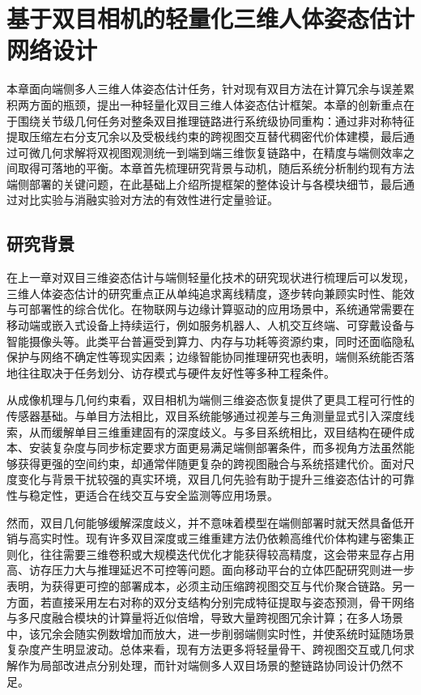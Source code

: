 \clearpage
\section{基于双目相机的轻量化三维人体姿态估计网络设计}

本章面向端侧多人三维人体姿态估计任务，针对现有双目方法在计算冗余与误差累积两方面的瓶颈，提出一种轻量化双目三维人体姿态估计框架。本章的创新重点在于围绕关节级几何任务对整条双目推理链路进行系统级协同重构：通过非对称特征提取压缩左右分支冗余以及受极线约束的跨视图交互替代稠密代价体建模，最后通过可微几何求解将双视图观测统一到端到端三维恢复链路中，在精度与端侧效率之间取得可落地的平衡。本章首先梳理研究背景与动机，随后系统分析制约现有方法端侧部署的关键问题，在此基础上介绍所提框架的整体设计与各模块细节，最后通过对比实验与消融实验对方法的有效性进行定量验证。

\subsection{研究背景}
在上一章对双目三维姿态估计与端侧轻量化技术的研究现状进行梳理后可以发现，三维人体姿态估计的研究重点正从单纯追求离线精度，逐步转向兼顾实时性、能效与可部署性的综合优化。在物联网与边缘计算驱动的应用场景中，系统通常需要在移动端或嵌入式设备上持续运行，例如服务机器人、人机交互终端、可穿戴设备与智能摄像头等。此类平台普遍受到算力、内存与功耗等资源约束，同时还面临隐私保护与网络不确定性等现实因素；边缘智能协同推理研究也表明，端侧系统能否落地往往取决于任务划分、访存模式与硬件友好性等多种工程条件。

从成像机理与几何约束看，双目相机为端侧三维姿态恢复提供了更具工程可行性的传感器基础。与单目方法相比，双目系统能够通过视差与三角测量显式引入深度线索，从而缓解单目三维重建固有的深度歧义。与多目系统相比，双目结构在硬件成本、安装复杂度与同步标定要求方面更易满足端侧部署条件，而多视角方法虽然能够获得更强的空间约束，却通常伴随更复杂的跨视图融合与系统搭建代价。面对尺度变化与背景干扰较强的真实环境，双目几何先验有助于提升三维姿态估计的可靠性与稳定性，更适合在线交互与安全监测等应用场景。

然而，双目几何能够缓解深度歧义，并不意味着模型在端侧部署时就天然具备低开销与高实时性。现有许多双目深度或三维重建方法仍依赖高维代价体构建与密集正则化，往往需要三维卷积或大规模迭代优化才能获得较高精度，这会带来显存占用高、访存压力大与推理延迟不可控等问题。面向移动平台的立体匹配研究则进一步表明，为获得更可控的部署成本，必须主动压缩跨视图交互与代价聚合链路。另一方面，若直接采用左右对称的双分支结构分别完成特征提取与姿态预测，骨干网络与多尺度融合模块的计算量将近似倍增，导致大量跨视图冗余计算；在多人场景中，该冗余会随实例数增加而放大，进一步削弱端侧实时性，并使系统时延随场景复杂度产生明显波动。总体来看，现有方法更多将轻量骨干、跨视图交互或几何求解作为局部改进点分别处理，而针对端侧多人双目场景的整链路协同设计仍然不足。

